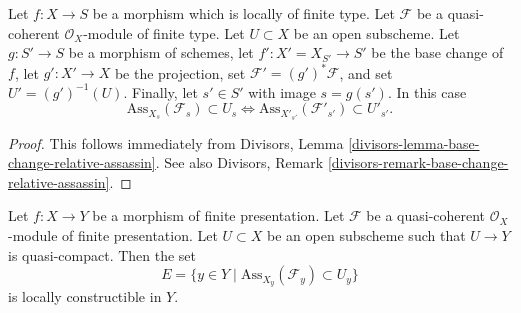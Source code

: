 \begin{lemma}
\label{lemma-base-change-assassin-in-U}
Let $f : X \to S$ be a morphism which is locally of finite type.
Let $\mathcal{F}$ be a quasi-coherent $\mathcal{O}_X$-module
of finite type. Let $U \subset X$ be an open subscheme.
Let $g : S' \to S$ be a morphism of schemes, let
$f' : X' = X_{S'} \to S'$ be the base change of $f$,
let $g' : X' \to X$ be the projection, set
$\mathcal{F}' = (g')^*\mathcal{F}$, and set
$U' = (g')^{-1}(U)$. Finally, let $s' \in S'$ with image $s = g(s')$.
In this case
$$
\text{Ass}_{X_s}(\mathcal{F}_s) \subset U_s
\Leftrightarrow
\text{Ass}_{X'_{s'}}(\mathcal{F}'_{s'}) \subset U'_{s'}.
$$
\end{lemma}

\begin{proof}
This follows immediately from
Divisors, Lemma \ref{divisors-lemma-base-change-relative-assassin}.
See also
Divisors, Remark \ref{divisors-remark-base-change-relative-assassin}.
\end{proof}

\begin{lemma}
\label{lemma-relative-assassin-constructible}
Let $f : X \to Y$ be a morphism of finite presentation.
Let $\mathcal{F}$ be a quasi-coherent $\mathcal{O}_X$-module
of finite presentation. Let $U \subset X$ be an open subscheme
such that $U \to Y$ is quasi-compact. Then the set
$$
E = \{y \in Y \mid \text{Ass}_{X_y}(\mathcal{F}_y) \subset U_y\}
$$
is locally constructible in $Y$.
\end{lemma}

